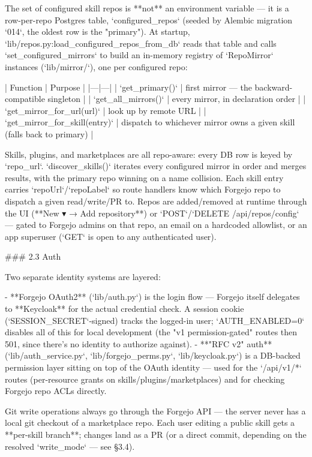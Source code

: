 The set of configured skill repos is **not** an environment variable — it is a row-per-repo Postgres table, `configured_repos` (seeded by Alembic migration `014`, the oldest row is the "primary"). At startup, `lib/repos.py:load_configured_repos_from_db` reads that table and calls `set_configured_mirrors` to build an in-memory registry of `RepoMirror` instances (`lib/mirror/`), one per configured repo:

| Function | Purpose |
|---|---|
| `get_primary()` | first mirror — the backward-compatible singleton |
| `get_all_mirrors()` | every mirror, in declaration order |
| `get_mirror_for_url(url)` | look up by remote URL |
| `get_mirror_for_skill(entry)` | dispatch to whichever mirror owns a given skill (falls back to primary) |

Skills, plugins, and marketplaces are all repo-aware: every DB row is keyed by `repo_url`. `discover_skills()` iterates every configured mirror in order and merges results, with the primary repo winning on a name collision. Each skill entry carries `repoUrl`/`repoLabel` so route handlers know which Forgejo repo to dispatch a given read/write/PR to. Repos are added/removed at runtime through the UI (**New ▾ → Add repository**) or `POST`/`DELETE /api/repos/config` — gated to Forgejo admins on that repo, an email on a hardcoded allowlist, or an app superuser (`GET` is open to any authenticated user).

### 2.3 Auth

Two separate identity systems are layered:

- **Forgejo OAuth2** (`lib/auth.py`) is the login flow — Forgejo itself delegates to **Keycloak** for the actual credential check. A session cookie (`SESSION_SECRET`-signed) tracks the logged-in user; `AUTH_ENABLED=0` disables all of this for local development (the "v1 permission-gated" routes then 501, since there's no identity to authorize against).
- **"RFC v2" auth** (`lib/auth_service.py`, `lib/forgejo_perms.py`, `lib/keycloak.py`) is a DB-backed permission layer sitting on top of the OAuth identity — used for the `/api/v1/*` routes (per-resource grants on skills/plugins/marketplaces) and for checking Forgejo repo ACLs directly.

Git write operations always go through the Forgejo API — the server never has a local git checkout of a marketplace repo. Each user editing a public skill gets a **per-skill branch**; changes land as a PR (or a direct commit, depending on the resolved `write_mode` — see §3.4).

